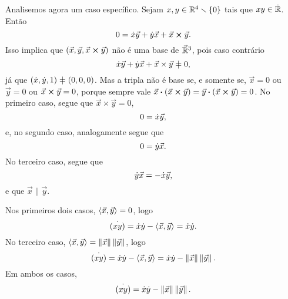 Analisemos agora um caso específico. Sejam $x,y \in \mathbb{R}^4 \smallsetminus \{0\}$ tais que $xy \in \dot{\mathbb{R}}$. Então
	\begin{equation*}
	0 = \dot{x}\vec{y}+\dot{y}\vec{x}+{\vec{x}} \bm{\times} {\vec{y}}.
	\end{equation*}
%
%
Isso implica que $(\vec{x},\vec{y},{\vec{x}} \bm{\times} {\vec{y}})$ não é uma base de $\vec{\mathbb{R}}^3$, pois caso contrário
	\begin{equation*}
	\esc{x}\vec{y}+\esc{y}\vec{x}+\vec{x} \times \vec{y} \neq 0,
	\end{equation*}
já que $(\esc{x},\esc{y},1) \neq (0,0,0)$. Mas a tripla não é base se, e somente se, $\vec{x}=0$ ou $\vec{y}=0$ ou ${\vec{x}} \bm{\times} {\vec{y}}=0$, porque sempre vale ${\vec{x}} \bm{\cdot} {({\vec{x}} \bm{\times} {\vec{y}})} = {\vec{y}} \bm{\cdot} {({\vec{x}} \bm{\times} {\vec{y}})}=0$. No primeiro caso, segue que $\vec{x} \times \vec{y}=0$,
	\begin{equation*}
	0=\dot{x}\vec{y},
	\end{equation*}
e, no segundo caso, analogamente segue que
	\begin{equation*}
	0=\dot{y}\vec{x}.
	\end{equation*}
No terceiro caso, segue que
	\begin{equation*}
	\dot{y}\vec{x} = -\dot{x}\vec{y},
	\end{equation*}
e que $\vec{x} \parallel \vec{y}$.

Nos primeiros dois casos, $\left\langle{\vec{x}},{\vec{y}}\right\rangle=0$, logo
	\begin{equation*}
	\dot{(xy)} = \dot{x}\dot{y} - \left\langle{\vec{x}},{\vec{y}}\right\rangle = \dot{x}\dot{y}.
	\end{equation*}
No terceiro caso, $\left\langle{\vec{x}},{\vec{y}}\right\rangle=\left\Vert{\vec{x}}\right\Vert\left\Vert{\vec{y}}\right\Vert$, logo
	\begin{equation*}
	\dot{(xy)} = \dot{x}\dot{y} - \left\langle{\vec{x}},{\vec{y}}\right\rangle = \dot{x}\dot{y} - \left\Vert{\vec{x}}\right\Vert\left\Vert{\vec{y}}\right\Vert.
	\end{equation*}
Em ambos os casos,
	\begin{equation*}
	\dot{(xy)} = \dot{x}\dot{y} - \left\Vert{\vec{x}}\right\Vert\left\Vert{\vec{y}}\right\Vert.
	\end{equation*}





